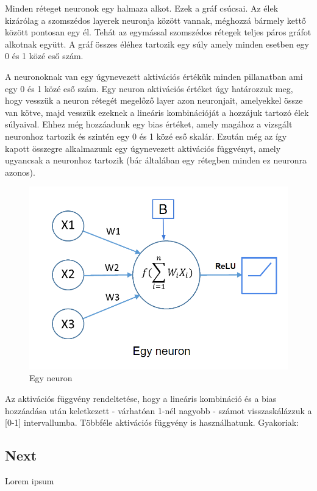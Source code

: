 \documentclass[12pt]{article}
\begin{document}
Minden réteget neuronok egy halmaza alkot. Ezek a gráf csúcsai. Az élek kizárólag a szomszédos layerek neuronja között vannak, méghozzá bármely kettő között pontosan egy él. Tehát az egymással szomszédos rétegek teljes páros gráfot alkotnak együtt. A gráf összes éléhez tartozik egy súly amely minden esetben egy 0 és 1 közé eső szám.

A neuronoknak van egy úgynevezett aktivációs értékük minden pillanatban ami egy 0 és 1 közé eső szám. Egy neuron aktivációs értéket úgy határozzuk meg, hogy vesszük a neuron rétegét megelőző layer azon neuronjait, amelyekkel össze van kötve, majd vesszük ezeknek a lineáris kombinációját a hozzájuk tartozó élek súlyaival. Ehhez még hozzáadunk egy bias értéket, amely magához a vizsgált neuronhoz tartozik és szintén egy 0 és 1 közé eső skalár.
Ezután még az így kapott összegre alkalmazunk egy úgynevezett aktivációs függvényt, amely ugyancsak a neuronhoz tartozik (bár általában egy rétegben minden ez neuronra azonos).

\begin{figure}[h!]
  \includegraphics[width=\linewidth]{neuron.png}
  \caption{Egy neuron}
\end{figure}

Az aktivációs függvény rendeltetése, hogy a lineáris kombináció és a bias hozzáadása után keletkezett - várhatóan 1-nél nagyobb - számot visszaskálázzuk a [0-1] intervallumba.
Többféle aktivációs függvény is használhatunk. Gyakoriak:


\subsection{Next}

Lorem ipsum
\end{document}
